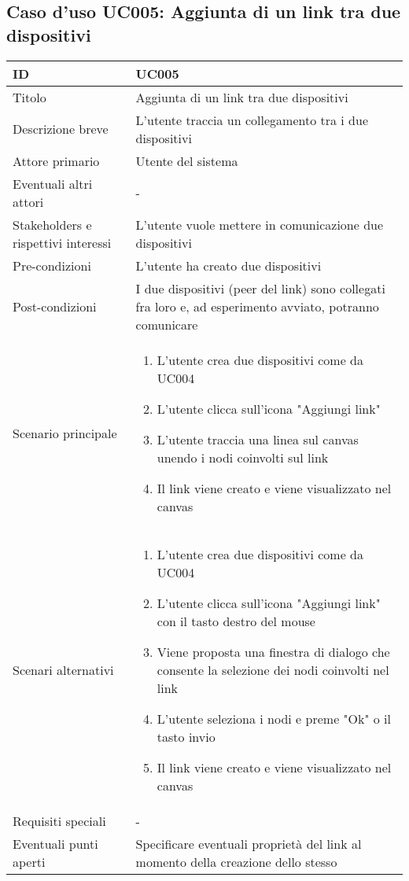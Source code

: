 \documentclass[../../main.tex]{subfiles}
\begin{document}
\subsection{Caso d’uso UC005: Aggiunta di un link tra due dispositivi }
\begin{tabularx}{150mm}{|l|X|}
    \hline
    ID                                  & \textbf{UC005}\\
    \hline
    Titolo                              & Aggiunta di un link tra due dispositivi \\
    \hline
    Descrizione breve                   & L'utente traccia un collegamento tra i due dispositivi   \\
    \hline
    Attore primario                     & Utente del sistema   \\
    \hline
    Eventuali altri attori              & -  \\
    \hline
    Stakeholders e rispettivi interessi & L'utente vuole mettere in comunicazione due dispositivi   \\
    \hline
    Pre-condizioni                      & L'utente ha creato due dispositivi   \\
    \hline
    Post-condizioni                     & I due dispositivi (peer del link) sono collegati fra loro e, ad esperimento avviato, potranno comunicare   \\
    \hline
    Scenario principale                 &
    \begin {enumerate}
\item L'utente crea due dispositivi come da UC004
\item L'utente clicca sull'icona "Aggiungi link"
\item L'utente traccia una linea sul canvas unendo i nodi coinvolti sul link
\item Il link viene creato e viene visualizzato nel canvas
    \end {enumerate}
    \\
    \hline
    Scenari alternativi                 &    
    \begin {enumerate}
\item L'utente crea due dispositivi come da UC004
\item L'utente clicca sull'icona "Aggiungi link" con il tasto destro del mouse
\item Viene proposta una finestra di dialogo che consente la selezione dei nodi coinvolti nel link 
\item L'utente seleziona i nodi e preme "Ok" o il tasto invio
\item Il link viene creato e viene visualizzato nel canvas
    \end {enumerate} \\

    \hline
    Requisiti speciali                  &    -\\
    \hline
    Eventuali punti aperti              &    Specificare eventuali proprietà del link al momento della creazione dello stesso\\
    \hline
\end{tabularx}
\newpage
\end{document}
